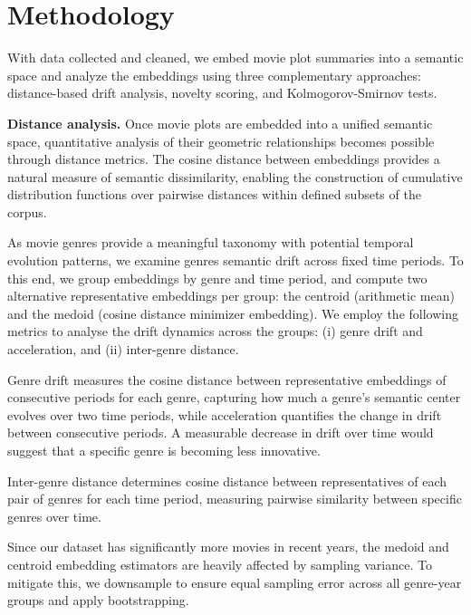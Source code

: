 \documentclass{article}
\begin{document}
\section{Methodology}\label{sec:methodology}

With data collected and cleaned, we embed movie plot summaries into a semantic space and analyze the embeddings using three complementary approaches: distance-based drift analysis, novelty scoring, and Kolmogorov-Smirnov tests.

\textbf{Distance analysis.} Once movie plots are embedded into a unified semantic space, quantitative analysis of their geometric relationships becomes possible through distance metrics. The cosine distance between embeddings provides a natural measure of semantic dissimilarity, enabling the construction of cumulative distribution functions over pairwise distances within defined subsets of the corpus.

As movie genres provide a meaningful taxonomy with potential temporal evolution patterns, we examine genres semantic drift across fixed time periods. To this end, we group embeddings by genre and time period, and compute two alternative representative embeddings per group: the centroid (arithmetic mean) and the medoid (cosine distance minimizer embedding). We employ the following metrics to analyse the drift dynamics across the groups: (i) genre drift and acceleration, and (ii) inter-genre distance.

Genre drift measures the cosine distance between representative embeddings of consecutive periods for each genre, capturing how much a genre's semantic center evolves over two time periods, while acceleration quantifies the change in drift between consecutive periods. A measurable decrease in drift over time would suggest that a specific genre is becoming less innovative.

Inter-genre distance determines cosine distance between representatives of each pair of genres for each time period, measuring pairwise similarity between specific genres over time.

Since our dataset has significantly more movies in recent years, the medoid and centroid embedding estimators are heavily affected by sampling variance. To mitigate this, we downsample to ensure equal sampling error across all genre-year groups and apply bootstrapping.
\end{document}
